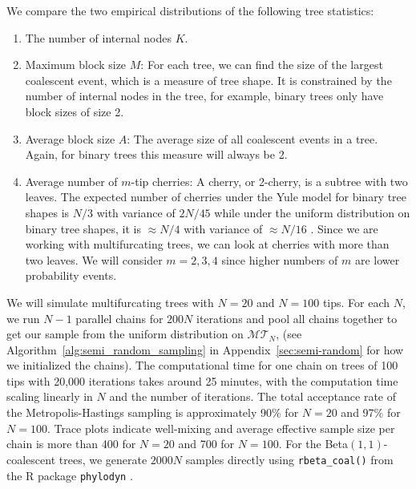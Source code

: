 \documentclass{article}
\begin{document}
We compare the two empirical distributions of the following tree statistics:
\begin{enumerate}
    \item The number of internal nodes $K$. 
    \item Maximum block size $M$: For each tree, we can find the size of the largest coalescent event, which is a measure of tree shape. It is constrained by the number of internal nodes in the tree, for example, binary trees only have block sizes of size 2. 
    \item Average block size $A$: The average size of all coalescent events in a tree. Again, for binary trees this measure will always be 2. 
    \item Average number of $m$-tip cherries: A cherry, or 2-cherry,  is a subtree with two leaves. The expected number of cherries under the Yule model for binary tree shapes is $N/3$ with variance of $2N/45$ while under the uniform distribution on binary tree shapes, it is $\approx N/4$ with variance of $\approx N/16$ \citep{McKenzie2000}. Since we are working with multifurcating trees, we can look at cherries with more than two leaves. We will consider $m=2,3,4$ since higher numbers of $m$ are lower probability events. 
\end{enumerate}

We will simulate multifurcating trees with $N=20$ and $N=100$ tips. For each $N$, we run $N-1$ parallel chains for $200N$ iterations and pool all chains together to get our sample from the uniform distribution on $\mathcal{MT}_N$, %
(see Algorithm~\ref{alg:semi_random_sampling} in Appendix~\ref{sec:semi-random} for how we initialized the chains). The computational time for one chain on trees of 100 tips with 20,000 iterations takes around 25 minutes, with the computation time scaling linearly in $N$ and the number of iterations. The total acceptance rate of the Metropolis-Hastings sampling is approximately 90\% for $N=20$ and 97\% for $N=100$. Trace plots indicate well-mixing and average effective sample size per chain is more than 400 for $N=20$ and 700 for $N=100$. For the Beta$(1,1)$-coalescent trees, we generate $2000N$ samples directly using \texttt{rbeta\_coal()} from the R package \texttt{phylodyn} \citep{karcher2017phylodyn}.\\ 
\end{document}
